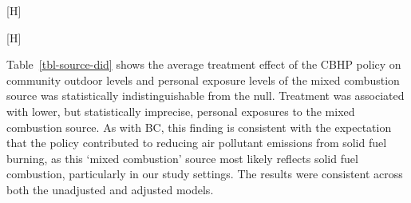 \documentclass[
  letterpaper,
  DIV=11,
  numbers=noendperiod]{scrartcl}
\makeatletter
\renewenvironment{figure}%
   {\renewcommand\familydefault\sfdefault
    \@float{figure}}
   {\end@float}
\providecommand{\DIFaddbeginFL}{} %
\providecommand{\DIFaddendFL}{} %
\providecommand{\DIFdelbeginFL}{} %
\providecommand{\DIFdelendFL}{} %
\newcommand{\DIFscaledelfig}{0.5}
\newlength{\DIFdelgraphicswidth} %
\newlength{\DIFdelgraphicsheight} %
\newcommand{\DIFaddincludegraphics}[2][]{{\color{blue}\fbox{\DIFOincludegraphics[#1]{#2}}}} %
\newcommand{\DIFdelincludegraphics}[2][]{%
\sbox{\DIFdelgraphicsbox}{\DIFOincludegraphics[#1]{#2}}%
\settoboxwidth{\DIFdelgraphicswidth}{\DIFdelgraphicsbox} %
\settoboxtotalheight{\DIFdelgraphicsheight}{\DIFdelgraphicsbox} %
\scalebox{\DIFscaledelfig}{%
\parbox[b]{\DIFdelgraphicswidth}{\usebox{\DIFdelgraphicsbox}\\[-\baselineskip] \rule{\DIFdelgraphicswidth}{0em}}\llap{\resizebox{\DIFdelgraphicswidth}{\DIFdelgraphicsheight}{%
\setlength{\unitlength}{\DIFdelgraphicswidth}%
\begin{picture}(1,1)%
\thicklines\linethickness{2pt} %
{\color[rgb]{1,0,0}\put(0,0){\framebox(1,1){}}}%
{\color[rgb]{1,0,0}\put(0,0){\line( 1,1){1}}}%
{\color[rgb]{1,0,0}\put(0,1){\line(1,-1){1}}}%
\end{picture}%
}\hspace*{3pt}}} %
} %
\DeclareRobustCommand{\DIFaddbeginFL}{\DIFOaddbeginFL \let\includegraphics\DIFaddincludegraphics} %
\DeclareRobustCommand{\DIFaddendFL}{\DIFOaddendFL \let\includegraphics\DIFOincludegraphics} %
\DeclareRobustCommand{\DIFdelbeginFL}{\DIFOdelbeginFL \let\includegraphics\DIFdelincludegraphics} %
\DeclareRobustCommand{\DIFdelendFL}{\DIFOaddendFL \let\includegraphics\DIFOincludegraphics} %
\makeatother
\begin{document}
\begin{figure}[H]

\DIFdelbeginFL %
\DIFdelendFL \DIFaddbeginFL {}
\DIFaddendFL 

\DIFdelbeginFL %

\DIFdelendFL \caption{\label{fig-source-figure}Source profiles for the 4-factor PMF
solution to the sum of elements, ions, elemental carbon, and organic
carbon for outdoor and personal PM\textsubscript{2.5} exposure
measurements. The lines separate the major contributing species to each
source}

\end{figure}%

\begin{figure}[H]

\DIFdelbeginFL %
\DIFdelendFL \DIFaddbeginFL {}
\DIFaddendFL 

\DIFdelbeginFL %

\DIFdelendFL \caption{\label{fig-source-season}Arithmetic mean dispersion normalized
source contributions found from the 4-factor PMF solution for \textbf{A}
outdoor and \textbf{B} personal PM\textsubscript{2.5} exposure samples
by year the group received treatment.}

\end{figure}%

Table~\ref{tbl-source-did} shows the average treatment effect of the
CBHP policy on community outdoor levels and personal exposure levels of
the mixed combustion source was statistically indistinguishable from the
null. Treatment was associated with lower, but statistically imprecise,
personal exposures to the mixed combustion source. As with BC, this
finding is consistent with the expectation that the policy contributed
to reducing air pollutant emissions from solid fuel burning, as this
`mixed combustion' source most likely reflects solid fuel combustion,
particularly in our study settings. The results were consistent across
both the unadjusted and adjusted models.
\end{document}

